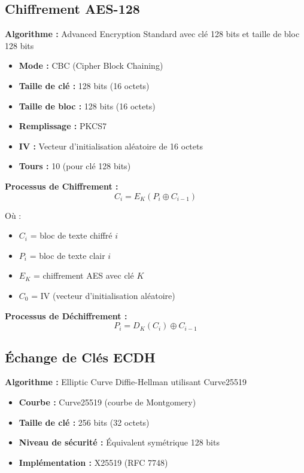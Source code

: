 \documentclass[12pt,a4paper]{report}
\begin{document}
\subsection{Chiffrement AES-128}

\textbf{Algorithme :} Advanced Encryption Standard avec clé 128 bits et taille de bloc 128 bits

\begin{itemize}
    \item \textbf{Mode :} CBC (Cipher Block Chaining)
    \item \textbf{Taille de clé :} 128 bits (16 octets)
    \item \textbf{Taille de bloc :} 128 bits (16 octets)
    \item \textbf{Remplissage :} PKCS7
    \item \textbf{IV :} Vecteur d'initialisation aléatoire de 16 octets
    \item \textbf{Tours :} 10 (pour clé 128 bits)
\end{itemize}

\textbf{Processus de Chiffrement :}
\begin{equation}
C_i = E_K(P_i \oplus C_{i-1})
\end{equation}

Où :
\begin{itemize}
    \item $C_i$ = bloc de texte chiffré $i$
    \item $P_i$ = bloc de texte clair $i$
    \item $E_K$ = chiffrement AES avec clé $K$
    \item $C_0$ = IV (vecteur d'initialisation aléatoire)
\end{itemize}

\textbf{Processus de Déchiffrement :}
\begin{equation}
P_i = D_K(C_i) \oplus C_{i-1}
\end{equation}

\subsection{Échange de Clés ECDH}

\textbf{Algorithme :} Elliptic Curve Diffie-Hellman utilisant Curve25519

\begin{itemize}
    \item \textbf{Courbe :} Curve25519 (courbe de Montgomery)
    \item \textbf{Taille de clé :} 256 bits (32 octets)
    \item \textbf{Niveau de sécurité :} Équivalent symétrique 128 bits
    \item \textbf{Implémentation :} X25519 (RFC 7748)
\end{itemize}
\end{document}

